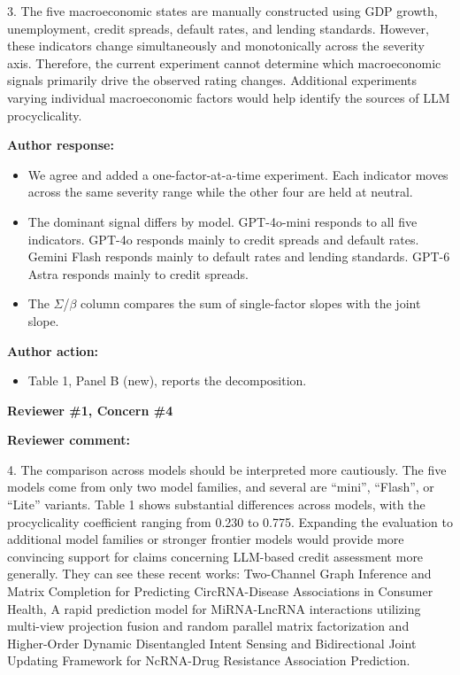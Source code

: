 \documentclass[11pt]{article}
\newcommand{\rvcomment}[1]{{\color{ReviewerGreen}#1}}
\newcommand{\concern}[1]{\textbf{\color{ReviewerGreen}#1}}
\begin{document}
\rvcomment{3. The five macroeconomic states are manually constructed using GDP growth, unemployment, credit spreads, default rates, and lending standards. However, these indicators change simultaneously and monotonically across the severity axis. Therefore, the current experiment cannot determine which macroeconomic signals primarily drive the observed rating changes. Additional experiments varying individual macroeconomic factors would help identify the sources of LLM procyclicality.}

\textbf{Author response:}

\begin{itemize}

\item We agree and added a one-factor-at-a-time experiment. Each indicator moves across the same severity range while the other four are held at neutral.

\item The dominant signal differs by model. GPT-4o-mini responds to all five indicators. GPT-4o responds mainly to credit spreads and default rates. Gemini Flash responds mainly to default rates and lending standards. GPT-6 Astra responds mainly to credit spreads.

\item The $\Sigma$/$\beta$ column compares the sum of single-factor slopes with the joint slope.

\end{itemize}

\textbf{Author action:}

\begin{itemize}

\item Table 1, Panel B (new), reports the decomposition.

\end{itemize}

\vspace{12pt}
\concern{Reviewer \#1, Concern \#4}

\concern{Reviewer comment:}

\rvcomment{4. The comparison across models should be interpreted more cautiously. The five models come from only two model families, and several are ``mini'', ``Flash'', or ``Lite'' variants. Table 1 shows substantial differences across models, with the procyclicality coefficient ranging from 0.230 to 0.775. Expanding the evaluation to additional model families or stronger frontier models would provide more convincing support for claims concerning LLM-based credit assessment more generally. They can see these recent works: Two-Channel Graph Inference and Matrix Completion for Predicting CircRNA-Disease Associations in Consumer Health, A rapid prediction model for MiRNA-LncRNA interactions utilizing multi-view projection fusion and random parallel matrix factorization and Higher-Order Dynamic Disentangled Intent Sensing and Bidirectional Joint Updating Framework for NcRNA-Drug Resistance Association Prediction.}
\end{document}
